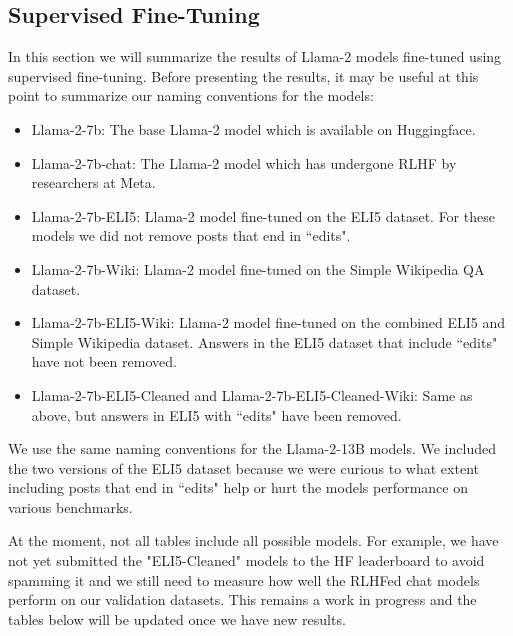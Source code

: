 \documentclass[11pt, oneside]{article}   	%
\begin{document}
\subsection{Supervised Fine-Tuning}
In this section we will summarize the results of Llama-2 models fine-tuned using supervised fine-tuning.
Before presenting the results, it may be useful at this point to summarize our naming conventions for the models:
\begin{itemize}
\item Llama-2-7b: The base Llama-2 model which is available on Huggingface.
\item Llama-2-7b-chat: The Llama-2 model which has undergone RLHF by researchers at Meta.
\item Llama-2-7b-ELI5: Llama-2 model fine-tuned on the ELI5 dataset. For these models we did not remove posts that end in ``edits".
\item Llama-2-7b-Wiki: Llama-2 model fine-tuned on the Simple Wikipedia QA dataset.
\item Llama-2-7b-ELI5-Wiki: Llama-2 model fine-tuned on the combined ELI5 and Simple Wikipedia dataset. Answers in the ELI5 dataset that include ``edits" have not been removed.
\item Llama-2-7b-ELI5-Cleaned and Llama-2-7b-ELI5-Cleaned-Wiki: Same as above, but answers in ELI5 with ``edits" have been removed. 
\end{itemize}
We use the same naming conventions for the Llama-2-13B models. 
We included the two versions of the ELI5 dataset because we were curious to what extent including posts that end in ``edits" help or hurt the models performance on various benchmarks.

At the moment, not all tables include all possible models.
For example, we have not yet submitted the "ELI5-Cleaned" models to the HF leaderboard to avoid spamming it and we still need to measure how well the RLHFed chat models perform on our validation datasets.
This remains a work in progress and the tables below will be updated once we have new results.
\end{document}
